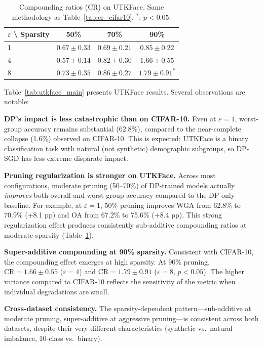 \documentclass{article}
\newcommand{\CR}{\text{CR}}
\begin{document}
\begin{table}[t]
\caption{Compounding ratios ($\CR$) on UTKFace. Same methodology as Table~\ref{tab:cr_cifar10}. $^*$: $p < 0.05$.}
\label{tab:cr_utkface}
\centering
\small
\begin{tabular}{lccc}
\toprule
$\varepsilon$ \textbackslash{} Sparsity & 50\% & 70\% & 90\% \\
\midrule
1 & $0.67 \pm 0.33$ & $0.69 \pm 0.21$ & $0.85 \pm 0.22$ \\
4 & $0.57 \pm 0.14$ & $0.82 \pm 0.30$ & $1.66 \pm 0.55$ \\
8 & $0.73 \pm 0.35$ & $0.86 \pm 0.27$ & $\mathbf{1.79 \pm 0.91}^*$ \\
\bottomrule
\end{tabular}
\end{table}


Table~\ref{tab:utkface_main} presents UTKFace results. Several observations are notable:

\textbf{DP's impact is less catastrophic than on CIFAR-10.} Even at $\varepsilon = 1$, worst-group accuracy remains substantial (62.8\%), compared to the near-complete collapse (1.6\%) observed on CIFAR-10. This is expected: UTKFace is a binary classification task with natural (not synthetic) demographic subgroups, so DP-SGD has less extreme disparate impact.

\textbf{Pruning regularization is stronger on UTKFace.} Across most configurations, moderate pruning (50--70\%) of DP-trained models actually \emph{improves} both overall and worst-group accuracy compared to the DP-only baseline. For example, at $\varepsilon = 1$, 50\% pruning improves WGA from 62.8\% to 70.9\% (+8.1 pp) and OA from 67.2\% to 75.6\% (+8.4 pp). This strong regularization effect produces consistently sub-additive compounding ratios at moderate sparsity (Table~\ref{tab:cr_utkface}).

\textbf{Super-additive compounding at 90\% sparsity.} Consistent with CIFAR-10, the compounding effect emerges at high sparsity. At 90\% pruning, $\CR = 1.66 \pm 0.55$ ($\varepsilon = 4$) and $\CR = 1.79 \pm 0.91$ ($\varepsilon = 8$, $p < 0.05$). The higher variance compared to CIFAR-10 reflects the sensitivity of the metric when individual degradations are small.

\textbf{Cross-dataset consistency.} The sparsity-dependent pattern---sub-additive at moderate pruning, super-additive at aggressive pruning---is consistent across both datasets, despite their very different characteristics (synthetic vs.\ natural imbalance, 10-class vs.\ binary).
\end{document}
